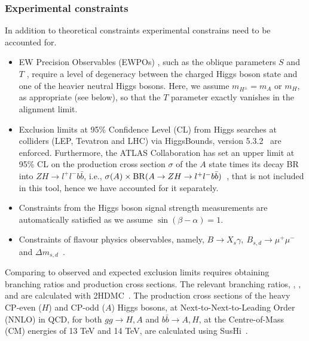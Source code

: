 \subsubsection{Experimental constraints}
In addition to theoretical constraints experimental constrains need to be accounted for.
\begin{itemize}
	\item EW Precision Observables (EWPOs) \cite{Haller2018EWUpdate}, such as the oblique parameters $S$ and $T$ \cite{Peskin:1991sw, Grimus2008Oblique}, require a level of degeneracy between the charged Higgs boson state and one of the heavier neutral Higgs bosons. Here, we assume $m_{H^\pm} = m_{A}$  or $m_H$, as appropriate (see below), so that the $T$ parameter exactly vanishes in the alignment limit. 
    \item Exclusion limits at 95\% Confidence Level (CL) from Higgs searches at colliders (LEP, Tevatron and LHC) via HiggsBounds, version 5.3.2~\cite{Bechtle2009higgsbounds, Bechtle2011higgsbounds2, Bechtle2014higgsbounds4} are enforced.
    Furthermore, the ATLAS Collaboration has set an upper limit at 95\% CL on the production cross section $\sigma$ of the $A$ state times its decay BR into $ZH\to l^+l^-b\bar b$, i.e., \(\sigma(A)\times {\rm BR}(A\rightarrow ZH \rightarrow l^+l^-b\bar b)\)~\cite{Aaboud2018AZHbbll}, that is not included in this tool, hence we have accounted for it separately.
	
\item Constraints from the Higgs boson signal strength measurements are automatically satisfied as we assume $\sin(\beta-\alpha) =1$.	
	
\item Constraints of {flavour physics observables,} namely, \(B \rightarrow X_s \gamma,~ B_{s,d} \rightarrow \mu^+\mu^-\) and \(\Delta m_{s,d}\)~\cite{Haller2018EWUpdate}.		
\end{itemize}

Comparing to observed and expected exclusion limits requires obtaining branching ratios and production cross sections.
The relevant branching ratios, \AZH{}, \HZA{}, \Abb{} and \Hbb{} are calculated with 2HDMC~\cite{Eriksson20102HDMC}.
The production cross sections of the heavy CP-even ($H$) and CP-odd ($A$) Higgs bosons,
at Next-to-Next-to-Leading Order (NNLO) in QCD, 
for both $gg\to H,A$ and $b\bar b\to A,H$, at the Centre-of-Mass (CM) energies of 13 TeV and 14 TeV,
are calculated using SusHi~\cite{Harlander2013SusHi, Harlander2017Bento, Harlander2002nexttonext, Harlander:2003ai}. 

